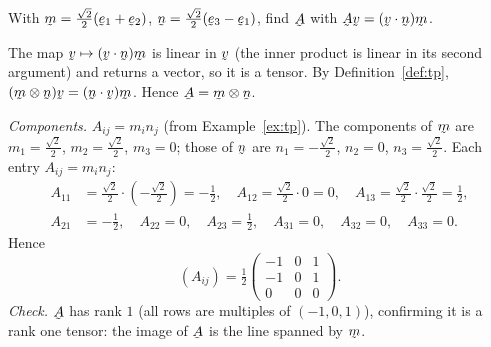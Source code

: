 \begin{problem}
With $\bmv=\tfrac{\sqrt2}{2}(\be_1+\be_2)$,
$\bn=\tfrac{\sqrt2}{2}(\be_3-\be_1)$, find $\bA$ with
$\bA\bv=(\ip\bv\bn)\bmv$.
\end{problem}
\begin{solution}
The map $\bv\mapsto(\ip\bv\bn)\bmv$ is linear in $\bv$ (the inner product
is linear in its second argument) and returns a vector, so it is a tensor.
By Definition~\ref{def:tp}, $(\bmv\otimes\bn)\bv=(\ip\bn\bv)\bmv$. Hence
$\bA=\bmv\otimes\bn$.

\emph{Components.} $A_{ij}=m_in_j$ (from Example~\ref{ex:tp}). The
components of $\bmv$ are
$m_1=\tfrac{\sqrt2}{2}$, $m_2=\tfrac{\sqrt2}{2}$, $m_3=0$;
those of $\bn$ are $n_1=-\tfrac{\sqrt2}{2}$, $n_2=0$, $n_3=\tfrac{\sqrt2}{2}$.
Each entry $A_{ij}=m_in_j$:
\[
\begin{aligned}
A_{11}&=\tfrac{\sqrt2}{2}\cdot(-\tfrac{\sqrt2}{2})=-\tfrac12,\quad
A_{12}=\tfrac{\sqrt2}{2}\cdot0=0,\quad
A_{13}=\tfrac{\sqrt2}{2}\cdot\tfrac{\sqrt2}{2}=\tfrac12,\\
A_{21}&=-\tfrac12,\quad A_{22}=0,\quad A_{23}=\tfrac12,\quad
A_{31}=0,\quad A_{32}=0,\quad A_{33}=0.
\end{aligned}
\]
Hence
\[
(A_{ij})=\tfrac12\begin{pmatrix}-1&0&1\\-1&0&1\\0&0&0\end{pmatrix}.
\]
\emph{Check.} $\bA$ has rank $1$ (all rows are multiples of $(-1,0,1)$),
confirming it is a rank one tensor: the image of $\bA$ is the line
spanned by $\bmv$.
\end{solution}

